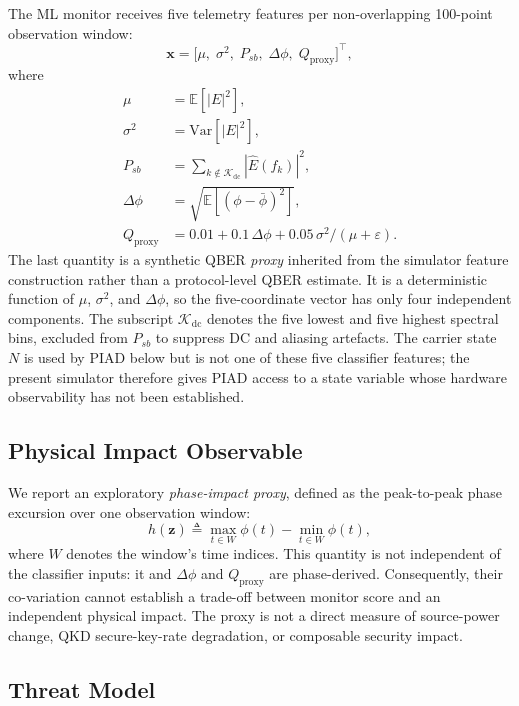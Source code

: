 \documentclass[journal,twocolumn]{IEEEtran}
\newcommand{\vx}{\mathbf{x}}
\newcommand{\vz}{\mathbf{z}}
\newcommand{\hobs}{h(\vz)}
\begin{document}
The ML monitor receives five telemetry features per non-overlapping 100-point
observation window:
\begin{equation}
  \vx = \bigl[\mu,\;\sigma^2,\;P_{sb},\;\Delta\phi,\;Q_{\mathrm{proxy}}\bigr]^{\!\top},
\end{equation}
where
\begin{align*}
  \mu       &= \mathbb{E}[|E|^2], \\
  \sigma^2  &= \mathrm{Var}[|E|^2], \\
  P_{sb}    &= \sum_{k \notin \mathcal{K}_\mathrm{dc}} |\hat{E}(f_k)|^2, \\
  \Delta\phi &= \sqrt{\mathbb{E}[(\phi-\bar{\phi})^2]}, \\
  Q_{\mathrm{proxy}} &= 0.01 + 0.1\,\Delta\phi
               + 0.05\,\sigma^2/(\mu+\varepsilon).
\end{align*}
The last quantity is a synthetic QBER \emph{proxy} inherited from the simulator
feature construction rather than a protocol-level QBER estimate. It is a deterministic
function of $\mu$, $\sigma^2$, and $\Delta\phi$, so the five-coordinate vector has
only four independent components. The subscript
$\mathcal{K}_\mathrm{dc}$ denotes the five lowest and five highest spectral bins,
excluded from $P_{sb}$ to suppress DC and aliasing artefacts.
The carrier state $N$ is used by PIAD below but is not one of these five classifier
features; the present simulator therefore gives PIAD access to a state variable whose
hardware observability has not been established.

\subsection{Physical Impact Observable}

We report an exploratory \emph{phase-impact proxy}, defined as the peak-to-peak
phase excursion over one observation window:
\begin{equation}
  \hobs \triangleq \max_{t\in W}\phi(t) - \min_{t\in W}\phi(t),
  \label{eq:impact}
\end{equation}
where $W$ denotes the window's time indices. This quantity is not independent of the
classifier inputs: it and $\Delta\phi$ and $Q_{\mathrm{proxy}}$ are phase-derived.
Consequently, their co-variation cannot establish a trade-off between monitor score
and an independent physical impact. The proxy is not a direct measure of source-power
change, QKD secure-key-rate degradation, or composable security impact.

\subsection{Threat Model}
\label{sec:threat}
\end{document}
